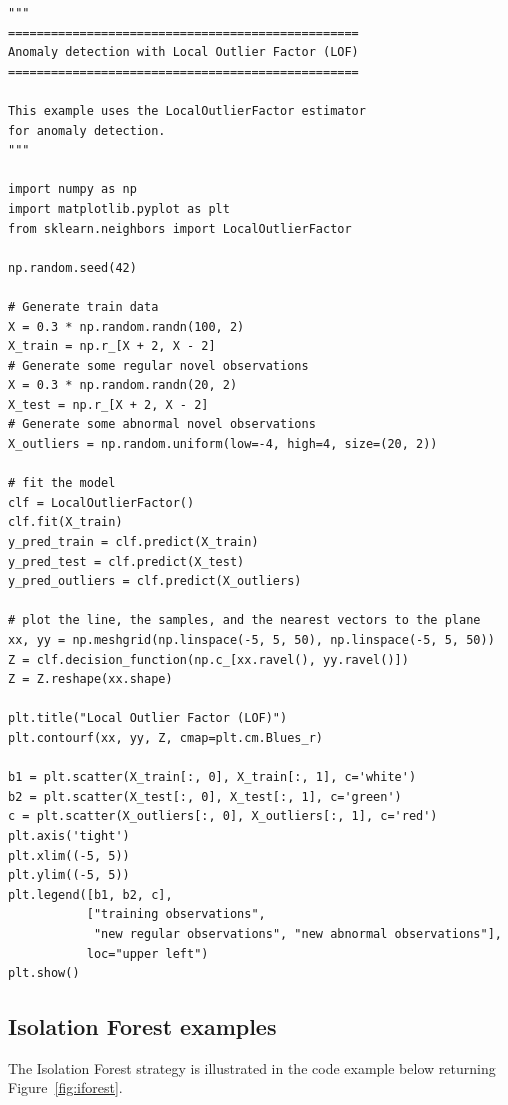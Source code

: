 \begin{mdframed}[hidealllines=true, backgroundcolor=lightgray] 
\begin{verbatim}
"""
=================================================
Anomaly detection with Local Outlier Factor (LOF)
=================================================

This example uses the LocalOutlierFactor estimator
for anomaly detection.
"""

import numpy as np
import matplotlib.pyplot as plt
from sklearn.neighbors import LocalOutlierFactor

np.random.seed(42)

# Generate train data
X = 0.3 * np.random.randn(100, 2)
X_train = np.r_[X + 2, X - 2]
# Generate some regular novel observations
X = 0.3 * np.random.randn(20, 2)
X_test = np.r_[X + 2, X - 2]
# Generate some abnormal novel observations
X_outliers = np.random.uniform(low=-4, high=4, size=(20, 2))

# fit the model
clf = LocalOutlierFactor()
clf.fit(X_train)
y_pred_train = clf.predict(X_train)
y_pred_test = clf.predict(X_test)
y_pred_outliers = clf.predict(X_outliers)

# plot the line, the samples, and the nearest vectors to the plane
xx, yy = np.meshgrid(np.linspace(-5, 5, 50), np.linspace(-5, 5, 50))
Z = clf.decision_function(np.c_[xx.ravel(), yy.ravel()])
Z = Z.reshape(xx.shape)

plt.title("Local Outlier Factor (LOF)")
plt.contourf(xx, yy, Z, cmap=plt.cm.Blues_r)

b1 = plt.scatter(X_train[:, 0], X_train[:, 1], c='white')
b2 = plt.scatter(X_test[:, 0], X_test[:, 1], c='green')
c = plt.scatter(X_outliers[:, 0], X_outliers[:, 1], c='red')
plt.axis('tight')
plt.xlim((-5, 5))
plt.ylim((-5, 5))
plt.legend([b1, b2, c],
           ["training observations",
            "new regular observations", "new abnormal observations"],
           loc="upper left")
plt.show()
\end{verbatim}
\end{mdframed}


\subsection{Isolation Forest examples}
The Isolation Forest strategy is illustrated in the code example below returning Figure~\ref{fig:iforest}.


